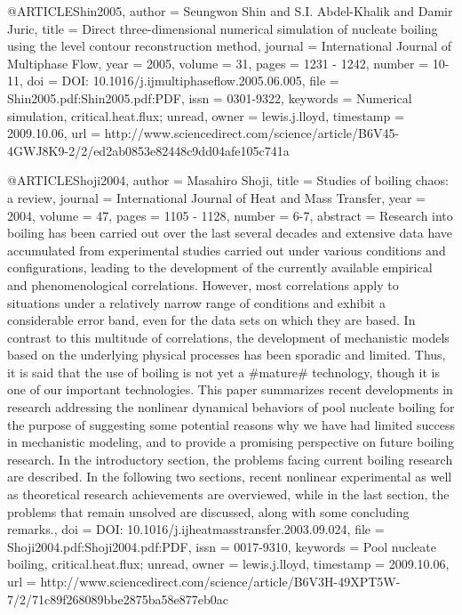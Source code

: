 {{@ARTICLE{Shin2005,
  author = {Seungwon Shin and S.I. Abdel-Khalik and Damir Juric},
  title = {Direct three-dimensional numerical simulation of nucleate boiling
	using the level contour reconstruction method},
  journal = {International Journal of Multiphase Flow},
  year = {2005},
  volume = {31},
  pages = {1231 - 1242},
  number = {10-11},
  doi = {DOI: 10.1016/j.ijmultiphaseflow.2005.06.005},
  file = {Shin2005.pdf:Shin2005.pdf:PDF},
  issn = {0301-9322},
  keywords = {Numerical simulation, critical.heat.flux; unread},
  owner = {lewis.j.lloyd},
  timestamp = {2009.10.06},
  url = {http://www.sciencedirect.com/science/article/B6V45-4GWJ8K9-2/2/ed2ab0853e82448c9dd04afe105c741a}
}

@ARTICLE{Shoji2004,
  author = {Masahiro Shoji},
  title = {Studies of boiling chaos: a review},
  journal = {International Journal of Heat and Mass Transfer},
  year = {2004},
  volume = {47},
  pages = {1105 - 1128},
  number = {6-7},
  abstract = {Research into boiling has been carried out over the last several decades
	and extensive data have accumulated from experimental studies carried
	out under various conditions and configurations, leading to the development
	of the currently available empirical and phenomenological correlations.
	However, most correlations apply to situations under a relatively
	narrow range of conditions and exhibit a considerable error band,
	even for the data sets on which they are based. In contrast to this
	multitude of correlations, the development of mechanistic models
	based on the underlying physical processes has been sporadic and
	limited. Thus, it is said that the use of boiling is not yet a #mature#
	technology, though it is one of our important technologies. This
	paper summarizes recent developments in research addressing the nonlinear
	dynamical behaviors of pool nucleate boiling for the purpose of suggesting
	some potential reasons why we have had limited success in mechanistic
	modeling, and to provide a promising perspective on future boiling
	research. In the introductory section, the problems facing current
	boiling research are described. In the following two sections, recent
	nonlinear experimental as well as theoretical research achievements
	are overviewed, while in the last section, the problems that remain
	unsolved are discussed, along with some concluding remarks.},
  doi = {DOI: 10.1016/j.ijheatmasstransfer.2003.09.024},
  file = {Shoji2004.pdf:Shoji2004.pdf:PDF},
  issn = {0017-9310},
  keywords = {Pool nucleate boiling, critical.heat.flux; unread},
  owner = {lewis.j.lloyd},
  timestamp = {2009.10.06},
  url = {http://www.sciencedirect.com/science/article/B6V3H-49XPT5W-7/2/71c89f268089bbe2875ba58e877eb0ac}
}

}}
